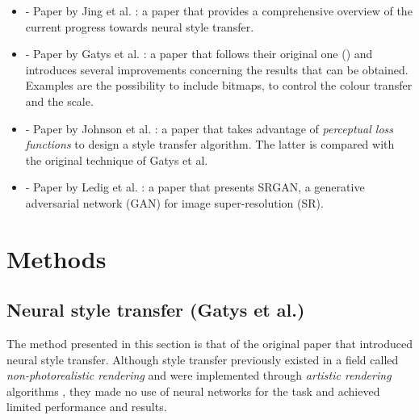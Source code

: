 \documentclass[twocolumn,superscriptaddress,aps, floatfix]{revtex4-1}
\begin{document}
    \begin{itemize}
        \item \cite{DBLP:journals/corr/JingYFYS17} - Paper by Jing et al. :  a paper that provides a comprehensive overview of the current progress towards neural style transfer.
        \item \cite{DBLP:journals/corr/GatysEBHS16} - Paper by Gatys et al. : a paper that follows their original one (\cite{DBLP:journals/corr/GatysEB15a}) and introduces several improvements concerning the results that can be obtained. Examples are the possibility to include bitmaps, to control the colour transfer and the scale.
        \item \cite{DBLP:journals/corr/JohnsonAL16} - Paper by Johnson et al. : a paper that takes advantage of \emph{perceptual loss functions} to design a style transfer algorithm. The latter is compared with the original technique of Gatys et al.
        \item \cite{DBLP:journals/corr/LedigTHCATTWS16} - Paper by Ledig et al. : a paper that presents SRGAN, a generative adversarial network (GAN) for image super-resolution (SR).
    \end{itemize}
    
    
    
    
    \section{Methods}
    
    \subsection{Neural style transfer (Gatys et al.)}\label{sec:methods.gatys}
    
    The method presented in this section is that of the original paper that introduced neural style transfer. Although style transfer previously existed in a field called \emph{non-photorealistic rendering} and were implemented through \emph{artistic rendering} algorithms \cite{DBLP:journals/corr/JingYFYS17}, they made no use of neural networks for the task and achieved limited performance and results.\\
    
\end{document}
